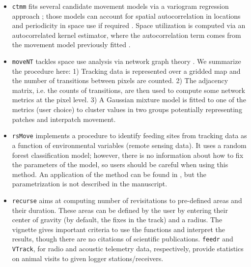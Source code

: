 \documentclass[a4paper,12pt]{article}
\newcommand{\Rpkg}[1]{\texttt{#1}}
\begin{document}
\begin{itemize}
	\item \Rpkg{ctmm} fits several candidate movement models via a variogram regression approach \citep{Fleming2014}; those models can account for spatial autocorrelation in locations and periodicity in space use if required \citep{Peron2016}. Space utilization is computed via an autocorrelated kernel estimator, where the autocorrelation term comes from the movement model previously fitted \citep{Fleming2015}. 
	\item \Rpkg{moveNT} tackles space use analysis via network graph theory \citep{Bastille2018}. We summarize the procedure here: 1) Tracking data is represented over a gridded map and the number of transitions between pixels are counted. 2) The adjacency matrix, i.e. the counts of transitions, are then used to compute some network metrics at the pixel level. 3) A Gaussian mixture model is fitted to one of the metrics (user choice) to cluster values in two groups potentially representing patches and interpatch movement.
	\item \Rpkg{rsMove} implements a procedure to identify feeding sites from tracking data as a function of environmental variables (remote sensing data). It uses a random forest classification model; however, there is no information about how to fix the parameters of the model, so users should be careful when using this method. An application of the method can be found in \cite{Remelgado2017}, but the parametrization is not described in the manuscript.
	\item \Rpkg{recurse} aims at computing number of revisitations to pre-defined areas and their duration. These areas can be defined by the user by entering their center of gravity (by default, the fixes in the track) and a radius. The vignette gives important criteria to use the functions and interpret the results, though there are no citations of scientific publications.
	\Rpkg{feedr} and \Rpkg{VTrack}, for radio and acoustic telemetry data, respectively, provide statistics on animal visits to given logger stations/receivers. 
\end{itemize}
\end{document}
